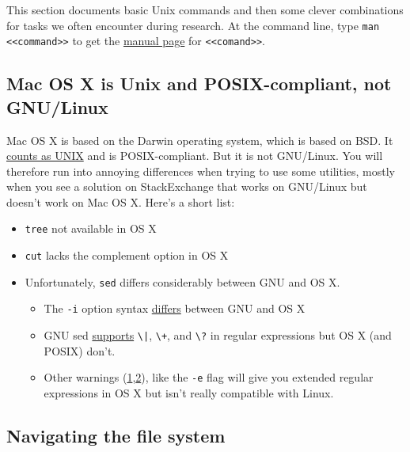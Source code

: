 \label{entry:unixshelltips}

This section documents basic Unix commands and then some clever combinations for tasks we often encounter during research.
At the command line, type \texttt{man <<command>>} to get the \href{https://en.wikipedia.org/wiki/Man_page}{manual page} for \texttt{<<comand>>}.

\subsection{Mac OS X is Unix and POSIX-compliant, not GNU/Linux}

Mac OS X is based on the Darwin operating system, which is based on BSD.
It \href{https://www.opengroup.org/openbrand/register/apple.htm}{counts as UNIX} and is POSIX-compliant.
But it is not GNU/Linux. 
You will therefore run into annoying differences when trying to use some utilities, mostly when you see a solution on StackExchange that works on GNU/Linux but doesn't work on Mac OS X.
Here's a short list:
\begin{itemize}
\item \texttt{tree} not available in OS X
\item \texttt{cut} lacks the complement option in OS X
\item Unfortunately, \texttt{sed} differs considerably between GNU and OS X.
\begin{itemize}
	\item The \texttt{-i} option syntax \href{https://stackoverflow.com/questions/2320564/i-need-my-sed-i-command-for-in-place-editing-to-work-with-both-gnu-sed-and-bsd}{differs} between GNU and OS X
	\item GNU sed \href{https://unix.stackexchange.com/questions/13711/differences-between-sed-on-mac-osx-and-other-standard-sed}{supports} \texttt{\textbackslash|}, \texttt{\textbackslash+}, and \texttt{\textbackslash?} in regular expressions but OS X (and POSIX) don't.
	\item Other warnings (\href{https://unix.stackexchange.com/a/131940}{1},\href{https://stackoverflow.com/questions/1227174/sed-on-os-x-cant-seem-to-use-in-regexps}{2}), like the \texttt{-e} flag will give you extended regular expressions in OS X but isn't really compatible with Linux.
\end{itemize}


\end{itemize}


\subsection{Navigating the file system}

